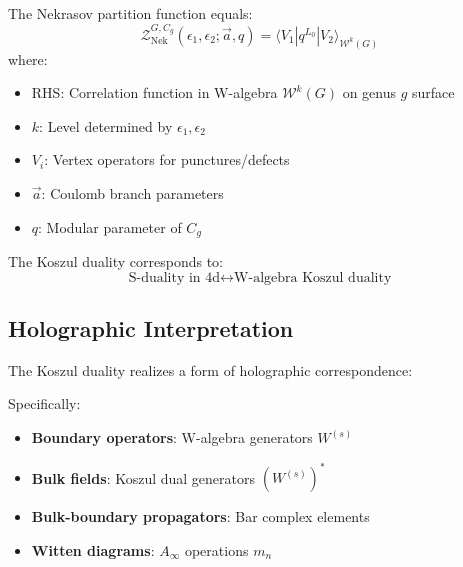 \begin{principle}
\begin{theorem}
The Nekrasov partition function equals:
\begin{equation}
\mathcal{Z}_{\text{Nek}}^{G, C_g}(\epsilon_1, \epsilon_2; \vec{a}, q) = \langle V_1 | q^{L_0} | V_2 \rangle_{\mathcal{W}^k(G)}
\end{equation}
where:
\begin{itemize}
\item RHS: Correlation function in W-algebra $\mathcal{W}^k(G)$ on genus $g$ surface
\item $k$: Level determined by $\epsilon_1, \epsilon_2$
\item $V_i$: Vertex operators for punctures/defects
\item $\vec{a}$: Coulomb branch parameters
\item $q$: Modular parameter of $C_g$
\end{itemize}

The Koszul duality corresponds to:
\begin{equation}
\text{S-duality in 4d} \longleftrightarrow \text{W-algebra Koszul duality}
\end{equation}
\end{theorem}

\subsection{Holographic Interpretation}

\begin{principle}
The Koszul duality realizes a form of holographic correspondence:

\begin{center}
\end{center}

Specifically:
\begin{itemize}
\item \textbf{Boundary operators}: W-algebra generators $W^{(s)}$
\item \textbf{Bulk fields}: Koszul dual generators $(W^{(s)})^*$
\item \textbf{Bulk-boundary propagators}: Bar complex elements
\item \textbf{Witten diagrams}: $A_\infty$ operations $m_n$
\end{itemize}
\end{principle}


\end{principle}
